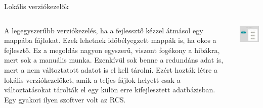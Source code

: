 \documentclass[english, aspectratio=169]{beamer}
\begin{document}
\begin{frame}{Lokális verziókezelők}
\begin{columns}
\begin{column}{0.5\textwidth}
A legegyszerűbb verziókezelés, ha a fejlessztő kézzel átmásol egy mappába fájlokat. Ezek lehetnek időbélyegzett mappák is, ha okos a fejlesztő. Ez a megoldás nagyon egyszerű, viszont fogékony a hibákra, mert sok a manuális munka. Ezenkívül sok benne a redundáns adat is, mert a nem változtatott adatot is el kell tárolni.  
Ezért hozták létre a lokális verziókezelőket, amik a teljes fájlok helyett csak a változtatásokat tárolták el egy külön erre kifejlesztett adatbázisban. Egy gyakori ilyen szoftver volt az RCS.
\end{column}
\begin{column}{0.5\textwidth}
\begin{center}
\includegraphics[width=7cm, keepaspectratio]{images/local_vcn.png}
\end{center}
\end{column}
\end{columns}
\end{frame}
\end{document}
